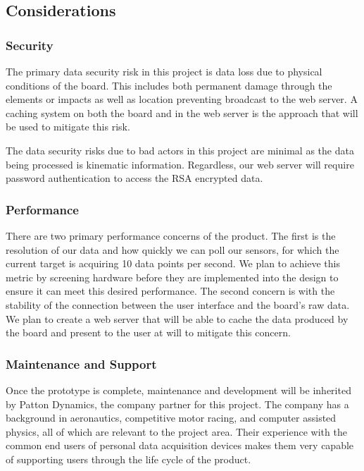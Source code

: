 \hypertarget{considerations}{%
\subsection{Considerations}\label{considerations}}

\hypertarget{security}{%
\subsubsection{Security}\label{security}}

The primary data security risk in this project is data loss due to
physical conditions of the board. This includes both permanent damage
through the elements or impacts as well as location preventing broadcast
to the web server. A caching system on both the board and in the web
server is the approach that will be used to mitigate this risk.

The data security risks due to bad actors in this project are minimal as
the data being processed is kinematic information. Regardless, our web
server will require password authentication to access the RSA encrypted
data.

\hypertarget{performance}{%
\subsubsection{Performance}\label{performance}}

There are two primary performance concerns of the product. The first is
the resolution of our data and how quickly we can poll our sensors, for
which the current target is acquiring 10 data points per second. We plan
to achieve this metric by screening hardware before they are implemented
into the design to ensure it can meet this desired performance. The
second concern is with the stability of the connection between the user
interface and the board's raw data. We plan to create a web server that
will be able to cache the data produced by the board and present to the
user at will to mitigate this concern.

\hypertarget{maintenance-and-support}{%
\subsubsection{Maintenance and Support}\label{maintenance-and-support}}

Once the prototype is complete, maintenance and development will be
inherited by Patton Dynamics, the company partner for this project. The
company has a background in aeronautics, competitive motor racing, and
computer assisted physics, all of which are relevant to the project
area. Their experience with the common end users of personal data
acquisition devices makes them very capable of supporting users through
the life cycle of the product.

